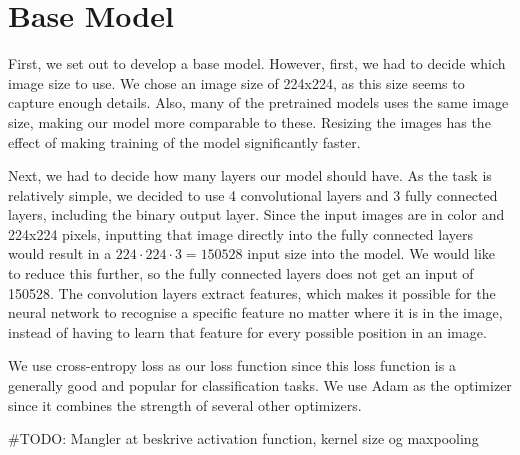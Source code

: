 \section{Base Model}
First, we set out to develop a base model. However, first, we had to decide which image size to use.
We chose an image size of 224x224, as this size seems to capture enough details. Also, many of the pretrained models uses the same image size, making our model more comparable to these.
Resizing the images has the effect of making training of the model significantly faster.

Next, we had to decide how many layers our model should have.
As the task is relatively simple, we decided to use 4 convolutional layers and 3 fully connected layers, including the binary output layer.
Since the input images are in color and 224x224 pixels, inputting that image directly into the fully connected layers would result in a $224\cdot224\cdot3 = 150528$ input size into the model. We would like to reduce this further, so the fully connected layers does not get an input of 150528. The convolution layers extract features, which makes it possible for the neural network to recognise a specific feature no matter where it is in the image, instead of having to learn that feature for every possible position in an image.

We use cross-entropy loss as our loss function since this loss function is a generally good and popular for classification tasks. We use Adam as the optimizer since it combines the strength of several other optimizers.

\#TODO: Mangler at beskrive activation function, kernel size og maxpooling


